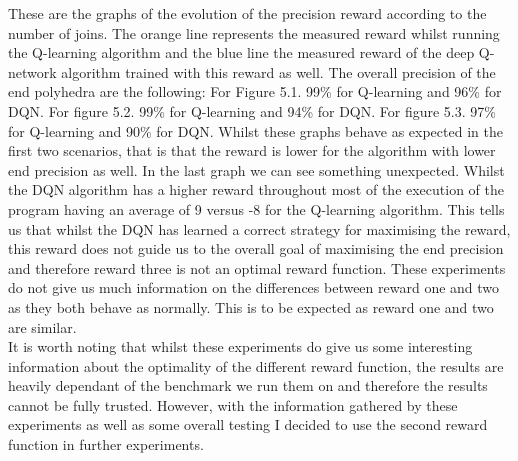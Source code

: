These are the graphs of the evolution of the precision reward according to the number of joins. The orange line represents the measured reward whilst running the Q-learning algorithm and the blue line the measured reward of the deep Q-network algorithm trained with this reward as well. The overall precision of the end polyhedra are the following: For Figure 5.1. 99\% for Q-learning and 96\% for DQN. For figure 5.2. 99\% for Q-learning and 94\% for DQN. For figure 5.3. 97\% for Q-learning and 90\% for DQN. Whilst these graphs behave as expected in the first two scenarios, that is that the reward is lower for the algorithm with lower end precision as well. In the last graph we can see something unexpected. Whilst the DQN algorithm has a higher reward throughout most of the execution of the program having an average of 9 versus -8 for the Q-learning algorithm. This tells us that whilst the DQN has learned a correct strategy for maximising the reward, this reward does not guide us to the overall goal of maximising the end precision and therefore reward three is not an optimal reward function. These experiments do not give us much information on the differences between reward one and two as they both behave as normally. This is to be expected as reward one and two are similar.\\
It is worth noting that whilst these experiments do give us some interesting information about the optimality of the different reward function, the results are heavily dependant of the benchmark we run them on and therefore the results cannot be fully trusted. However, with the information gathered by these experiments as well as some overall testing I decided to use the second reward function in further experiments.


